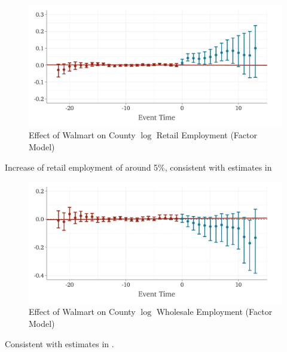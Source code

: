 \documentclass[aspectratio=43,t,11pt]{beamer}
\begin{document}
\begin{frame}{}
  \vspace{-\bigskipamount}
  \begin{figure}
    \caption{Effect of Walmart on County $\log$ Retail Employment (Factor Model)}
    \begin{adjustbox}{width=\textwidth}
      \includegraphics{../figures/plot_qld_retail.pdf}
    \end{adjustbox}
  \end{figure}

  Increase of retail employment of around 5\%, consistent with estimates in \citet{basker2005job}
\end{frame}


\begin{frame}{}
  \vspace{-\bigskipamount}
  \begin{figure}
    \caption{Effect of Walmart on County $\log$ Wholesale Employment (Factor Model)}
    \begin{adjustbox}{width=\textwidth}
      \includegraphics{../figures/plot_qld_wholesale.pdf}
    \end{adjustbox}
  \end{figure}

  Consistent with estimates in \citet{basker2005job}.
\end{frame}
\end{document}
